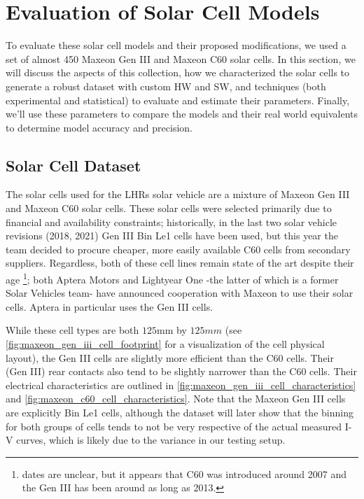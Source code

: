 \section{Evaluation of Solar Cell Models}\label{sec:evaluation_of_solar_cell_models}

To evaluate these solar cell models and their proposed modifications, we used a
set of almost 450 Maxeon Gen III and Maxeon C60 solar cells. In this section, we
will discuss the aspects of this collection, how we characterized the solar
cells to generate a robust dataset with custom \acf{HW} and \acf{SW}, and
techniques (both experimental and statistical) to evaluate and estimate their
parameters. Finally, we'll use these parameters to compare the models and their
real world equivalents to determine model accuracy and precision.


\subsection{Solar Cell Dataset}\label{subsec:solar_cell_dataset}

The solar cells used for the \ac{LHRs} solar vehicle are a mixture of Maxeon Gen
III and Maxeon C60 solar cells. These solar cells were selected primarily due to
financial and availability constraints; historically, in the last two solar
vehicle revisions (2018, 2021) Gen III Bin Le1 cells have been used, but this
year the team decided to procure cheaper, more easily available C60 cells from
secondary suppliers. Regardless, both of these cell lines remain state of the
art despite their age \footnote{dates are unclear, but it appears that C60 was
introduced around 2007\cite{sunpower_history} and the Gen III has been around as
long as 2013\cite{smith_et_al}.}; both Aptera Motors\cite{aptera_solar_cells}
and Lightyear One\cite{lightyear_one_solar_cells} -the latter of which is a
former Solar Vehicles team- have announced cooperation with Maxeon to use their
solar cells. Aptera in particular uses the Gen III
cells\cite{aptera_solar_cells}.

While these cell types are both $125 \si{\mm}$ by $125 \si{mm}$ (see
\autoref{fig:maxeon_gen_iii_cell_footprint} for a visualization of the cell
physical layout), the Gen III cells are slightly more efficient than the C60
cells. Their (Gen III) rear contacts also tend to be slightly narrower than the
C60 cells. Their electrical characteristics are outlined in
\autoref{fig:maxeon_gen_iii_cell_characteristics} and
\autoref{fig:maxeon_c60_cell_characteristics}. Note that the Maxeon Gen III
cells are explicitly Bin Le1 cells, although the dataset will later show that
the binning for both groups of cells tends to not be very respective of the
actual measured \ac{I-V} curves, which is likely due to the variance in our
testing setup.

